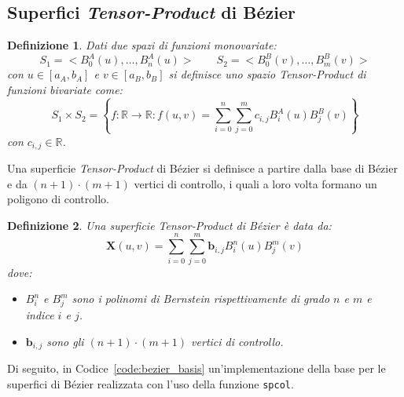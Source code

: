 \documentclass[a4paper, 12pt]{article}
\newtheorem{mydef}{Definizione}
\begin{document}
\subsection{Superfici \textit{Tensor-Product} di Bézier}
\begin{mydef}
  Dati due spazi di funzioni monovariate:
  $$S_1 = < B^{A}_{0}(u), \dots, B^{A}_{n}(u) > \qquad S_2 = < B^{B}_{0}(v), \dots, B^{B}_{m}(v) >$$
  con $u \in [a_A, b_A]$ e $v \in [a_B, b_B]$ si definisce uno spazio \textit{Tensor-Product} di funzioni bivariate come:
  $$S_1 \times S_2 = \left\{ f : \mathbb{R} \rightarrow \mathbb{R}: f(u, v) = \sum_{i = 0}^{n}\sum_{j = 0}^{m} c_{i,j}B^A_i(u)B^B_j(v) \right\}$$
  con $c_{i,j} \in \mathbb{R}$.
\end{mydef}
Una superficie \textit{Tensor-Product} di Bézier si definisce a partire dalla base di Bézier e da $(n+1)\cdot(m+1)$ vertici di controllo, i 
quali a loro volta formano un poligono di controllo. 
\begin{mydef}
  \label{def:tensor-prod-bez}
  Una superficie \textit{Tensor-Product} di Bézier è data da:
  $$\mathbf{X}(u, v) = \sum_{i = 0}^{n} \sum_{j = 0}^{m} \mathbf{b}_{i, j} B^{n}_{i}(u)B_{j}^{m}(v) $$
  dove:
  \begin{itemize}
    \item $B^{n}_{i}$ e $B^{m}_{j}$ sono i polinomi di Bernstein rispettivamente di 
    grado $n$ e $m$ e indice $i$ e $j$.
    \item $\mathbf{b}_{i,j}$ sono gli  $(n+1)\cdot(m+1)$ vertici di controllo.
  \end{itemize}
\end{mydef}
Di seguito, in Codice~\ref{code:bezier_basis} un'implementazione della base
per le superfici di Bézier realizzata con l'uso della funzione \texttt{spcol}.


\end{document}
